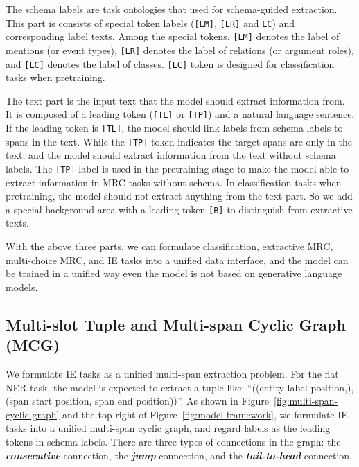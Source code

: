 The schema labels are task ontologies that used for schema-guided extraction.
This part is consists of special token labels (\verb|[LM]|, \verb|[LR]| and \verb|LC|) and corresponding label texts.
Among the special tokens, \verb|[LM]| denotes the label of mentions (or event types), \verb|[LR]| denotes the label of relations (or argument roles), and \verb|[LC]| denotes the label of classes.
\verb|[LC]| token is designed for classification tasks when pretraining.

The text part is the input text that the model should extract information from.
It is composed of a leading token (\verb|[TL]| or \verb|[TP]|) and a natural language sentence.
If the leading token is \verb|[TL]|, the model should link labels from schema labels to spans in the text.
While the \verb|[TP]| token indicates the target spans are only in the text, and the model should extract information from the text without schema labels.
The \verb|[TP]| label is used in the pretraining stage to make the model able to extract information in MRC tasks without schema.
In classification tasks when pretraining, the model should not extract anything from the text part.
So we add a special background area with a leading token \verb|[B]| to distinguish from extractive texts.

With the above three parts, we can formulate classification, extractive MRC, multi-choice MRC, and IE tasks into a unified data interface, and the model can be trained in a unified way even the model is not based on generative language models.

\subsection{Multi-slot Tuple and Multi-span Cyclic Graph (MCG)}

We formulate IE tasks as a unified multi-span extraction problem.
For the flat NER task, the model is expected to extract a tuple like: ``((entity label position,), (span start position, span end position))''.
As shown in Figure~\ref{fig:multi-span-cyclic-graph} and the top right of Figure~\ref{fig:model-framework}, we formulate IE tasks into a unified multi-span cyclic graph, and regard labels as the leading tokens in schema labels.
There are three types of connections in the graph: the \textbf{\textit{consecutive}} connection, the \textbf{\color[HTML]{695efb} \textit{jump}} connection, and the \textbf{\color[HTML]{E9087F}\textit{tail-to-head}} connection.


